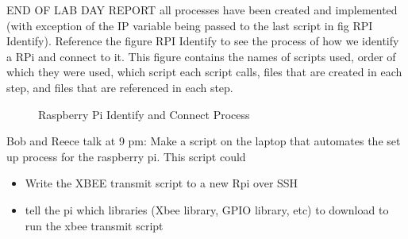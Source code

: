 \documentclass[fontsize=11pt, %
                             paper=letter, %
                             twoside, %
                             captions=tableheading,
                             index=totoc,
                             hyperref]{labbook}
\begin{document}
END OF LAB DAY REPORT
all processes have been created and implemented (with exception of the IP variable being passed to the last script in fig RPI Identify). Reference the figure RPI Identify to see the process of how we identify a RPi and connect to it. This figure contains the names of scripts used, order of which they were used, which script each script calls, files that are created in each step, and files that are referenced in each step. 
\begin{figure}
  \caption{Raspberry Pi Identify and Connect Process}
  \label{fig:RPiIdentify}
\end{figure}

Bob and Reece talk at 9 pm: Make a script on the laptop that automates the set up process for the raspberry pi. This script could 
\begin{itemize}
    \item Write the XBEE transmit script to a new Rpi over SSH 
    \item tell the pi which libraries (Xbee library, GPIO library, etc) to download to run the xbee transmit script
    
\end{itemize}
\end{document}
